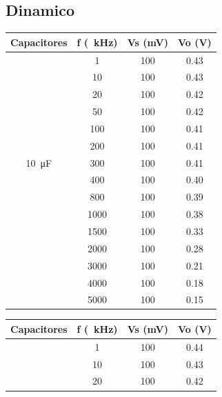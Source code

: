 \documentclass[a4paper,12pt]{article}
\begin{document}
\subsection{Dinamico}
\begin{table}[h]
    \centering
    \begin{tabular}{|c|c|c|c|}
        \hline
        Capacitores     & f (\SI{}{\kilo\hertz})    & Vs (mV)   & Vo (V)    \\ \hline
                                & 1    & 100 & 0.43  \\ \cline{2-4}
                                & 10   & 100 & 0.43  \\ \cline{2-4}
                                & 20   & 100 & 0.42  \\ \cline{2-4}
                                & 50   & 100 & 0.42 \\ \cline{2-4}
                                & 100  & 100 & 0.41  \\ \cline{2-4}
                                & 200  & 100 & 0.41  \\ \cline{2-4}
        \SI{10}{\micro F}       & 300  & 100 & 0.41  \\ \cline{2-4}
                                & 400  & 100 & 0.40   \\ \cline{2-4}
                                & 800  & 100 & 0.39  \\ \cline{2-4}
                                & 1000 & 100 & 0.38  \\ \cline{2-4}
                                & 1500 & 100 & 0.33  \\ \cline{2-4}
                                & 2000 & 100 & 0.28  \\ \cline{2-4}
                                & 3000 & 100 & 0.21  \\ \cline{2-4}
                                & 4000 & 100 & 0.18  \\ \cline{2-4}
                                & 5000 & 100 & 0.15  \\ \hline
    \end{tabular}
    \quad
    \begin{tabular}{|c|c|c|c|}
        \hline
        Capacitores     & f (\SI{}{\kilo\hertz})    & Vs (mV)   & Vo (V)    \\ \hline
                                & 1    & 100 & 0.44  \\ \cline{2-4}
                                & 10   & 100 & 0.43  \\ \cline{2-4}
                                & 20   & 100 & 0.42  \\ \cline{2-4}

\end{tabular}
\end{table}
\end{document}
